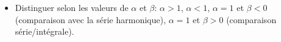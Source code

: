 \begin{itemize}
    \item Distinguer selon les valeurs de $\alpha$ et $\beta$: $\alpha > 1$, $\alpha < 1$, $\alpha = 1$ et $\beta < 0$ (comparaison avec la série harmonique), $\alpha = 1$ et $\beta > 0$ (comparaison série/intégrale).
\end{itemize}
